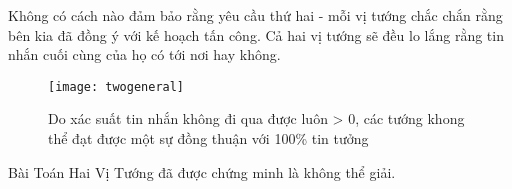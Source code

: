 Không có cách nào đảm bảo rằng yêu cầu thứ hai - mỗi vị tướng chắc chắn rằng bên kia đã đồng ý với kế hoạch tấn công. Cả hai vị tướng sẽ đều lo lắng rằng tin nhắn cuối cùng của họ có tới nơi hay không.

\begin{figure}[h]
	\centering
	\texttt{[image: twogeneral]}
	\caption{Do xác suất tin nhắn không đi qua được luôn > 0, các tướng khong thể đạt được một sự đồng thuận với 100\% tin tưởng}
	
\end{figure}


Bài Toán Hai Vị Tướng đã được chứng minh là không thể giải.